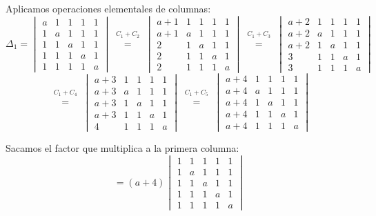 \documentclass[a4paper,12pt]{article}
\begin{document}
\begin{ejercicio}[title=Ejercicio 40]
Aplicamos operaciones elementales de columnas:
\[
\Delta_1 =
\begin{vmatrix}
a & 1 & 1 & 1 & 1\\
1 & a & 1 & 1 & 1\\
1 & 1 & a & 1 & 1\\
1 & 1 & 1 & a & 1\\
1 & 1 & 1 & 1 & a
\end{vmatrix}
\overset{\substack{C_1+C_2\\{}}}{=}
\begin{vmatrix}
a+1 & 1 & 1 & 1 & 1\\
a+1 & a & 1 & 1 & 1\\
2 & 1 & a & 1 & 1\\
2 & 1 & 1 & a & 1\\
2 & 1 & 1 & 1 & a
\end{vmatrix}
\overset{\substack{C_1+C_3\\{}}}{=}
\begin{vmatrix}
a+2 & 1 & 1 & 1 & 1\\
a+2 & a & 1 & 1 & 1\\
a+2 & 1 & a & 1 & 1\\
3 & 1 & 1 & a & 1\\
3 & 1 & 1 & 1 & a
\end{vmatrix}
\]
\[
\overset{\substack{C_1+C_4\\{}}}{=}
\begin{vmatrix}
a+3 & 1 & 1 & 1 & 1\\
a+3 & a & 1 & 1 & 1\\
a+3 & 1 & a & 1 & 1\\
a+3 & 1 & 1 & a & 1\\
4 & 1 & 1 & 1 & a
\end{vmatrix}
\overset{\substack{C_1+C_5\\{}}}{=}
\begin{vmatrix}
a+4 & 1 & 1 & 1 & 1\\
a+4 & a & 1 & 1 & 1\\
a+4 & 1 & a & 1 & 1\\
a+4 & 1 & 1 & a & 1\\
a+4 & 1 & 1 & 1 & a
\end{vmatrix}
\]

Sacamos el factor que multiplica a la primera columna:
\[
= (a+4)
\begin{vmatrix}
1 & 1 & 1 & 1 & 1\\
1 & a & 1 & 1 & 1\\
1 & 1 & a & 1 & 1\\
1 & 1 & 1 & a & 1\\
1 & 1 & 1 & 1 & a
\end{vmatrix}
\]


\end{ejercicio}
\end{document}
